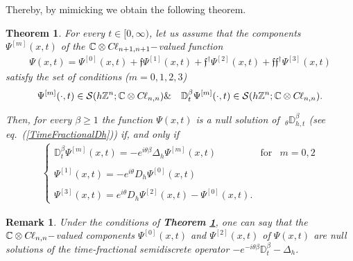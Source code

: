 \documentclass{elsarticle}
\newcommand{\BC}{{\mathbb C}}
\newcommand{\BZ}{{\mathbb Z}}
\newcommand{\RL}{{\mathbb D}_t}
\newcommand{\f}{{\mathfrak f}}
\newcommand{\cl}{C \kern -0.1em \ell}
\newtheorem{theorem}{Theorem}[section]
\newtheorem{remark}{Remark}[section]
\begin{document}
Thereby, by mimicking \cite[Theorem 4.1 \& Corollary 4.2]{CSV07} we obtain the following theorem.
\begin{theorem}\label{CoupledSystemParabolicDiracRLt}
	For every $t\in [0,\infty)$, let us assume that the components $\Psi^{[m]}(x,t)$ of the
	$\BC\otimes\cl_{n+1,n+1}-$valued function \begin{eqnarray*}
		\Psi(x,t)=\Psi^{[0]}(x,t)+\f\Psi^{[1]}(x,t)+\f^\dagger\Psi^{[2]}(x,t)+\f\f^\dagger\Psi^{[3]}(x,t)
	\end{eqnarray*}
	satisfy the set of conditions ($m=0,1,2,3$)
	\begin{eqnarray*}
		\Psi^{[m]}(\cdot,t)\in \mathcal{S}(h\BZ^n;\BC \otimes \cl_{n,n}) &\&& \mathbb{D}_t^\beta \Psi^{[m]}(\cdot,t)\in \mathcal{S}(h\BZ^n;\BC \otimes \cl_{n,n}). 
	\end{eqnarray*}
	
	Then, for every $\beta\geq 1$ the function $\Psi(x,t)$ is a null solution of ${~}_\theta\mathbb{D}_{h,t}^{\beta}$ (see eq.~(\ref{TimeFractionalDh})) if, and only if
	\begin{eqnarray}
		\label{CoupledSystemsHeatAlphaRL} \left\{\begin{array}{lll} 
			\RL^\beta\Psi^{[m]}(x,t)=-e^{i\theta\beta}\Delta_h\Psi^{[m]}(x,t) & \mbox{for} & m=0,2
			\\ \ \\
			\Psi^{[1]}(x,t)=-e^{i\theta}D_h\Psi^{[0]}(x,t) & &\\ \ \\
			\Psi^{[3]}(x,t)=e^{i\theta}D_h\Psi^{[2]}(x,t)-\Psi^{[0]}(x,t). &  & 
		\end{array}\right.
	\end{eqnarray}
\end{theorem}

\begin{remark}
	Under the conditions of {\bf Theorem \ref{CoupledSystemParabolicDiracRLt}}, one can say that the $\BC\otimes\cl_{n,n}-$valued components $\Psi^{[0]}(x,t)$ and $\Psi^{[2]}(x,t)$ of $\Psi(x,t)$ are null solutions of the {\it time-fractional semidiscrete operator} $-e^{-i\theta\beta}\RL^\beta-\Delta_h$.
\end{remark}
\end{document}
